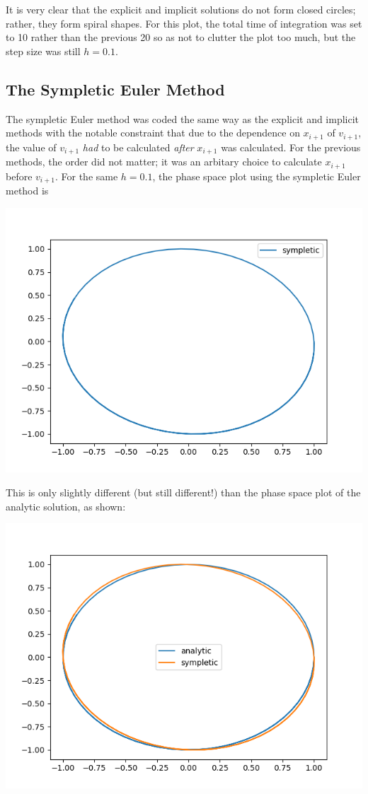 \documentclass{article}
\begin{document}
It is very clear that the explicit and implicit solutions do not form closed circles; rather, they form spiral shapes. For this plot, the total time of integration was set to 10 rather than the previous 20 so as not to clutter the plot too much, but the step size was still $ h = 0.1 $.

\subsection{The Sympletic Euler Method}
The sympletic Euler method was coded the same way as the explicit and implicit methods with the notable constraint that due to the dependence on $ x_{i+1} $ of $ v_{i+1} $, the value of $ v_{i+1} $ \textit{had} to be calculated \textit{after} $ x_{i+1} $ was calculated. For the previous methods, the order did not matter; it was an arbitary choice to calculate $ x_{i+1} $ before $ v_{i+1} $. For the same $ h = 0.1 $, the phase space plot using the sympletic Euler method is

\includegraphics[scale=0.9]{images/sympletic_phasespace.png}

This is only slightly different (but still different!) than the phase space plot of the analytic solution, as shown:

\includegraphics[scale=0.9]{images/analytic_vs_sympletic_phasespace.png}
\end{document}
